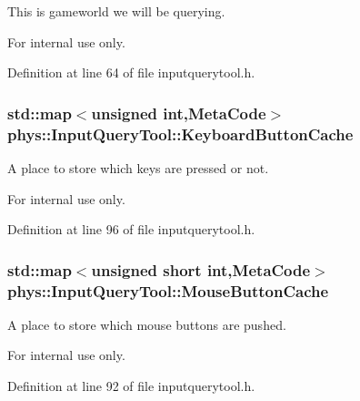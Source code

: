 This is gameworld we will be querying. 

\begin{DoxyInternal}{For internal use only.}
\end{DoxyInternal}


Definition at line 64 of file inputquerytool.h.

\hypertarget{classphys_1_1InputQueryTool_afd89b917cb11be11dc990d5ef9ddb2ff}{
\subsubsection[{KeyboardButtonCache}]{\setlength{\rightskip}{0pt plus 5cm}std::map$<$unsigned int,{\bf MetaCode}$>$ {\bf phys::InputQueryTool::KeyboardButtonCache}}}
\label{da/d96/classphys_1_1InputQueryTool_afd89b917cb11be11dc990d5ef9ddb2ff}


A place to store which keys are pressed or not. 

\begin{DoxyInternal}{For internal use only.}
\end{DoxyInternal}


Definition at line 96 of file inputquerytool.h.

\hypertarget{classphys_1_1InputQueryTool_a2fddedc3d3ac61a195289b55b0aec972}{
\subsubsection[{MouseButtonCache}]{\setlength{\rightskip}{0pt plus 5cm}std::map$<$unsigned short int,{\bf MetaCode}$>$ {\bf phys::InputQueryTool::MouseButtonCache}}}
\label{da/d96/classphys_1_1InputQueryTool_a2fddedc3d3ac61a195289b55b0aec972}


A place to store which mouse buttons are pushed. 

\begin{DoxyInternal}{For internal use only.}
\end{DoxyInternal}


Definition at line 92 of file inputquerytool.h.

